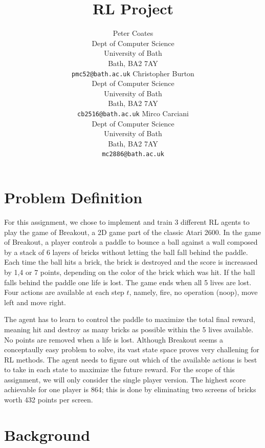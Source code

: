 \documentclass{article}
\title{RL Project}
\author{
  Peter Coates  \\
  Dept of Computer Science\\
  University of Bath\\
  Bath, BA2 7AY \\
  \texttt{pmc52@bath.ac.uk}
\And
  Christopher Burton\\
  Dept of Computer Science\\
  University of Bath \\
  Bath, BA2 7AY\\
  \texttt{cb2516@bath.ac.uk}
\And
  Mirco Carciani\\
  Dept of Computer Science\\
  University of Bath \\
  Bath, BA2 7AY\\
  \texttt{mc2886@bath.ac.uk}
}
\begin{document}
\maketitle

\section{Problem Definition}

For this assignment, we chose to implement and train 3 different RL agents to play the game of Breakout, a 2D game part of the classic Atari 2600.
In the game of Breakout, a player controls a paddle to bounce a ball against a wall composed by a stack of 6 layers of bricks without letting the ball fall behind the paddle. Each time the ball hits a brick, the brick is destroyed and the score is increasaed by 1,4 or 7 points, depending on the color of the brick which was hit. If the ball falls behind the paddle one life is lost. The game ends when all 5 lives are lost.
Four actions are available at each step $t$, namely, fire, no operation (noop), move left and move right.

The agent has to learn to control the paddle to maximize the  total final reward, meaning hit and destroy as many bricks as possible within the 5 lives available. No points are removed when a life is lost. Although Breakout seems a conceptaully easy problem to solve, its vast state space proves very challening for RL methods. The agent needs to figure out which of the available actions is best to take in each state to maximize the future reward. For the scope of this assignment, we will only consider the single player version. The highest score achievable for one player is 864; this is done by eliminating two screens of bricks worth 432 points per screen.

\section{Background}

\end{document}

